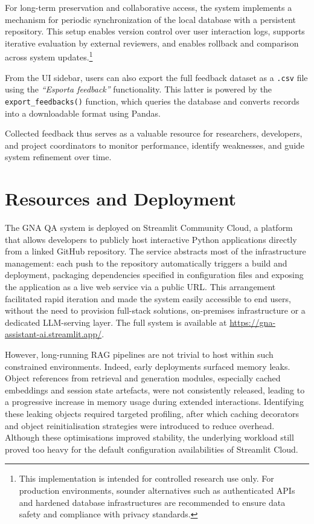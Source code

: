 \begin{spacing}{1.5}
For long-term preservation and collaborative access, the system implements a mechanism for periodic synchronization of the local database with a persistent repository. This setup enables version control over user interaction logs, supports iterative evaluation by external reviewers, and enables rollback and comparison across system updates.\footnote{This implementation is intended for controlled research use only. For production environments, sounder alternatives such as authenticated APIs and hardened database infrastructures are recommended to ensure data safety and compliance with privacy standards.}

From the UI sidebar, users can also export the full feedback dataset as a \texttt{.csv} file using the \textit{``Esporta feedback''} functionality. This latter is powered by the \texttt{export\_feedbacks()} function, which queries the database and converts records into a downloadable format using Pandas. 

Collected feedback thus serves as a valuable resource for researchers, developers, and project coordinators to monitor performance, identify weaknesses, and guide system refinement over time.


\section{Resources and Deployment}
The GNA QA system is deployed on Streamlit Community Cloud, a platform that allows developers to publicly host interactive Python applications directly from a linked GitHub repository. The service abstracts most of the infrastructure management: each push to the repository automatically triggers a build and deployment, packaging dependencies specified in configuration files and exposing the application as a live web service via a public URL. This arrangement facilitated rapid iteration and made the system easily accessible to end users, without the need to provision full-stack solutions, on-premises infrastructure or a dedicated LLM-serving layer. The full system is available at \url{https://gna-assistant-ai.streamlit.app/}.

However, long-running RAG pipelines are not trivial to host within such constrained environments. Indeed, early deployments surfaced memory leaks. Object references from retrieval and generation modules, especially cached embeddings and session state artefacts, were not consistently released, leading to a progressive increase in memory usage during extended interactions. Identifying these leaking objects required targeted profiling, after which caching decorators and object reinitialisation strategies were introduced to reduce overhead. Although these optimisations improved stability, the underlying workload still proved too heavy for the default configuration availabilities of Streamlit Cloud.


\end{spacing}
